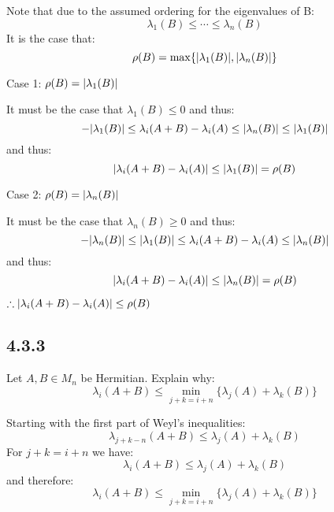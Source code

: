 \documentclass[letterpaper,12pt,fleqn]{article}
\renewcommand{\l}{\lambda}
\newcommand{\p}{\rho}
\begin{document}
Note that due to the assumed ordering for the eigenvalues of B:
\[\l_1(B)\le\cdots\le\l_n(B)\]
It is the case that:
\[\p(B)=\max\{\abs{\l_1(B)},\abs{\l_n(B)}\}\]
\begin{description}
\item Case 1: $\p(B)=\abs{\l_1(B)}$

  It must be the case that $\l_1(B)\le0$ and thus:
  \[-\abs{\l_1(B)}\le\l_i(A+B)-\l_i(A)\le\abs{\l_n(B)}\le\abs{\l_1(B)}\]
  and thus:
  \[\abs{\l_i(A+B)-\l_i(A)}\le\abs{\l_1(B)}=\p(B)\]

\item Case 2: $\p(B)=\abs{\l_n(B)}$

  It must be the case that $\l_n(B)\ge0$ and thus:
  \[-\abs{\l_n(B)}\le\abs{\l_1(B)}\le\l_i(A+B)-\l_i(A)\le\abs{\l_n(B)}\]
  and thus:
  \[\abs{\l_i(A+B)-\l_i(A)}\le\abs{\l_n(B)}=\p(B)\]
\end{description}

$\therefore\abs{\l_i(A+B)-\l_i(A)}\le\p(B)$

\subsection*{4.3.3}

Let $A,B\in M_n$ be Hermitian. Explain why:
\[\l_i(A+B)\le\min_{j+k=i+n}\{\l_j(A)+\l_k(B)\}\]

Starting with the first part of Weyl's inequalities:
\[\l_{j+k-n}(A+B)\le\l_j(A)+\l_k(B)\]
For $j+k=i+n$ we have:
\[\l_i(A+B)\le\l_j(A)+\l_k(B)\]
and therefore:
\[\l_i(A+B)\le\min_{j+k=i+n}\{\l_j(A)+\l_k(B)\}\]
\end{document}
